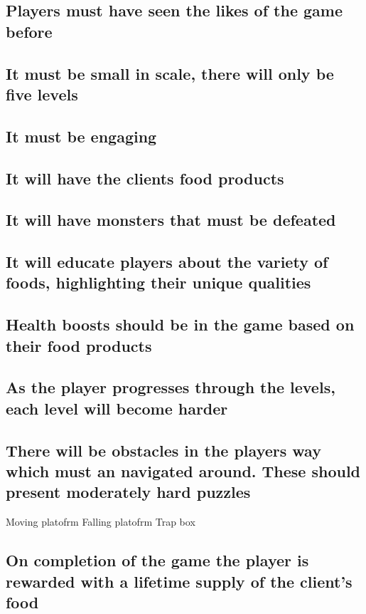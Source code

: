 \documentclass{article}
\begin{document}
\subsection{ Players must have seen the likes of the game before }
\subsection{ It must be small in scale, there will only be five levels }
\subsection{ It must be engaging }
\subsection{ It will have the clients food products }
\subsection{ It will have monsters that must be defeated }
\subsection{ It will educate players about the variety of foods, highlighting their unique qualities }
\subsection{ Health boosts should be in the game based on their food products }
\subsection{ As the player progresses through the levels, each level will become harder }
\subsection{ There will be obstacles in the players way which must an navigated around. These should present moderately hard puzzles }
Moving platofrm
Falling platofrm
Trap box

\subsection{ On completion of the game the player is rewarded with a lifetime supply of the client's food }



\end{document}
